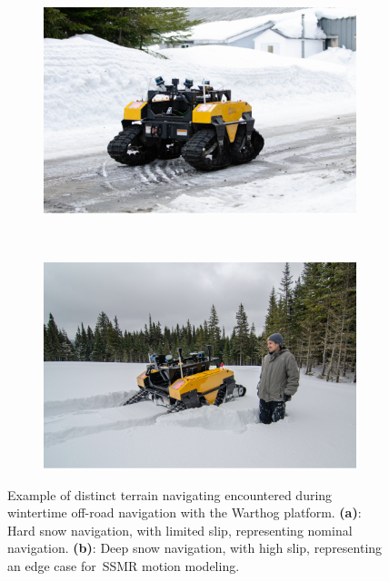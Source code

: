 \begin{figure}[h!]
	\begin{center}
		\begin{subfigure}[b]{0.49\textwidth}
			\includegraphics[width=\linewidth]{figs/warthog_hard_snow.pdf}
			\caption{}
			\label{fig:hard_snow}
		\end{subfigure}%
		~
		\begin{subfigure}[b]{0.49\textwidth}
			\includegraphics[width=\linewidth]{figs/snow_depth.pdf}
			\caption{}
			\label{fig:deep_snow}
		\end{subfigure}%
		\caption{
		Example of distinct terrain navigating encountered during wintertime off-road navigation with the Warthog platform.
		\textbf{(a)}: Hard snow navigation, with limited slip, representing nominal navigation.
		\textbf{(b)}: Deep snow navigation, with high slip, representing an edge case for~\ac{SSMR} motion modeling.
		}
		\label{fig:snow_var}
	\end{center}
\end{figure}

